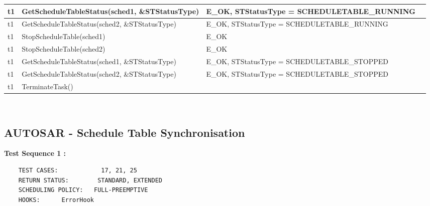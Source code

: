 \documentclass[10pt]{article}
\newlength{\Li}\settowidth{\Li}{Running}
\newlength{\Lii}\setlength{\Lii}{7cm}
\newlength{\Liiii}\setlength{\Liiii}{0.9cm}
\newlength{\Liii}\setlength{\Liii}{\textwidth} \addtolength{\Liii}{-\Li} \addtolength{\Liii}{-\Lii} \addtolength{\Liii}{-\Liiii}
\begin{document}
\begin{supertabular}{|p{\Li}|p{\Lii}|p{\Liii}|p{\Liiii}|}
	t1		& GetScheduleTableStatus(sched1, \&STStatusType)							& E\_OK, STStatusType = SCHEDULETABLE\_RUNNING		& \\ \hline
	t1		& GetScheduleTableStatus(sched2, \&STStatusType)							& E\_OK, STStatusType = SCHEDULETABLE\_RUNNING		& \\ \hline
	t1		& StopScheduleTable(sched1)												& E\_OK												& \\ \hline
	t1		& StopScheduleTable(sched2)												& E\_OK												& \\ \hline
	t1		& GetScheduleTableStatus(sched1, \&STStatusType)							& E\_OK, STStatusType = SCHEDULETABLE\_STOPPED		& \\ \hline
	t1		& GetScheduleTableStatus(sched2, \&STStatusType)							& E\_OK, STStatusType = SCHEDULETABLE\_STOPPED		& \\ \hline
	t1		& TerminateTask()														& 													& \\ \hline
	\end{supertabular}\\

\subsection{AUTOSAR - Schedule Table Synchronisation}

	\textbf{Test Sequence 1 :}
	\begin{lstlisting}
	TEST CASES:		       17, 21, 25
	RETURN STATUS:	 	  STANDARD, EXTENDED
	SCHEDULING POLICY:   FULL-PREEMPTIVE
	HOOKS:		ErrorHook
	\end{lstlisting}
	
	
\end{document}
